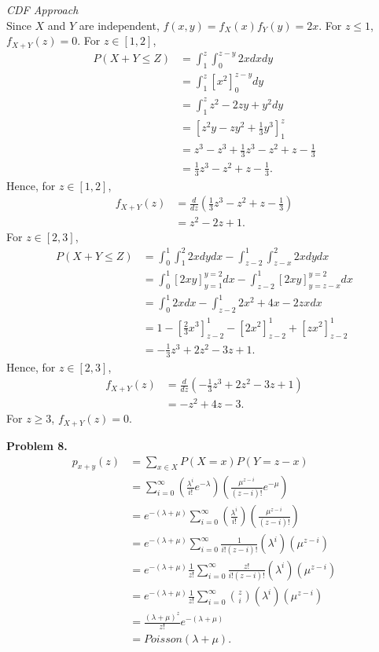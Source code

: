 \documentclass{article}
\begin{document}
\emph{CDF Approach}\\
Since $X$ and $Y$ are independent, $f(x,y)=f_X(x)f_Y(y)=2x$. For $z \le 1$, $f_{X+Y}(z)=0$. For $z \in [1,2]$, 
\begin{align}
    P(X+Y \le Z) & = \int_{1}^{z}\int_{0}^{z-y}2xdxdy \\
    & = \int_{1}^{z}\left[x^2\right]_0^{z-y}dy \\
    & = \int_{1}^{z}z^2-2zy+y^2dy \\
    & = \left[z^2y-zy^2+\frac{1}{3}y^3\right]_1^z \\
    & = z^3-z^3+\frac{1}{3}z^3-z^2+z-\frac{1}{3} \\
    & = \frac{1}{3}z^3-z^2+z-\frac{1}{3}.
\end{align}
Hence, for $z \in [1,2]$,
\begin{align}
    f_{X+Y}(z)&=\frac{d}{dz}\left(\frac{1}{3}z^3-z^2+z-\frac{1}{3}\right) \\
    & = z^2-2z+1.
\end{align}
For $z \in [2,3]$,
\begin{align}
    P(X+Y\le Z) & = \int_{0}^{1}\int_{1}^{2}2xdydx - \int_{z-2}^{1}\int_{z-x}^{2}2xdydx \\
    & = \int_{0}^{1}\left[2xy\right]_{y=1}^{y=2}dx - \int_{z-2}^{1}\left[2xy\right]_{y=z-x}^{y=2}dx \\
    & = \int_{0}^{1}2xdx-\int_{z-2}^{1}2x^2+4x-2zxdx \\
    & = 1 - \left[\frac{2}{3}x^3\right]_{z-2}^1 - \left[2x^2\right]_{z-2}^1 + \left[zx^2\right]_{z-2}^1 \\
    & = -\frac{1}{3}z^3+2z^2-3z+1.
\end{align}
Hence, for $z\in [2,3]$,
\begin{align}
    f_{X+Y}(z)&=\frac{d}{dz}\left(-\frac{1}{3}z^3+2z^2-3z+1\right) \\
    & = -z^2+4z-3.
\end{align}
For $z\ge 3$, $f_{X+Y}(z)=0$.
\bigbreak

\textbf{Problem 8.}
\begin{align}
    p_{x+y}(z)&=\sum_{x\in X}P(X=x)P(Y=z-x) \\
    & = \sum_{i=0}^{\infty}\left(\frac{\lambda^i}{i!}e^{-\lambda}\right)\left(\frac{\mu^{z-i}}{(z-i)!}e^{-\mu}\right) \\
    & = e^{-(\lambda+\mu)}\sum_{i=0}^{\infty}\left(\frac{\lambda^i}{i!}\right)\left(\frac{\mu^{z-i}}{(z-i)!}\right) \\
    & = e^{-(\lambda+\mu)}\sum_{i=0}^{\infty}\frac{1}{i!(z-i)!}(\lambda^i)(\mu^{z-i}) \\
    & = e^{-(\lambda+\mu)}\frac{1}{z!}\sum_{i=0}^{\infty}\frac{z!}{i!(z-i)!}(\lambda^i)(\mu^{z-i}) \\
    & = e^{-(\lambda+\mu)}\frac{1}{z!}\sum_{i=0}^{\infty}{z\choose i}(\lambda^i)(\mu^{z-i}) \\
    & = \frac{(\lambda+\mu)^z}{z!}e^{-(\lambda+\mu)} \\
    & = Poisson(\lambda+\mu).
\end{align}
\bigbreak
\end{document}
